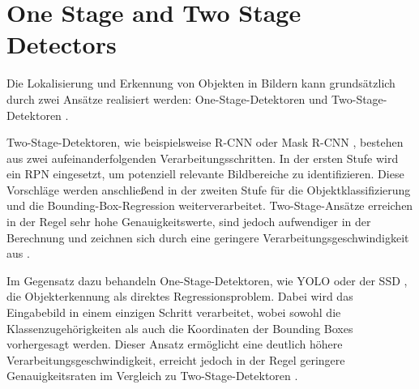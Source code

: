 \section{One Stage and Two Stage Detectors}

Die Lokalisierung und Erkennung von Objekten in Bildern kann grundsätzlich durch zwei Ansätze realisiert werden: One-Stage-Detektoren und Two-Stage-Detektoren \cite{Soviany2018}.

Two-Stage-Detektoren, wie beispielsweise \Acrfull{R-CNN} \cite{ren2016} oder Mask \acrshort{R-CNN} \cite{he2018}, bestehen aus zwei aufeinanderfolgenden Verarbeitungsschritten. In der ersten Stufe wird ein \Acrfull{RPN} eingesetzt, um potenziell relevante Bildbereiche zu identifizieren. Diese Vorschläge werden anschließend in der zweiten Stufe für die Objektklassifizierung und die Bounding-Box-Regression weiterverarbeitet. Two-Stage-Ansätze erreichen in der Regel sehr hohe Genauigkeitswerte, sind jedoch aufwendiger in der Berechnung und zeichnen sich durch eine geringere Verarbeitungsgeschwindigkeit aus \cite{Soviany2018}.

Im Gegensatz dazu behandeln One-Stage-Detektoren, wie \Acrfull{YOLO} \cite{redmon2016} oder der \Acrfull{SSD} \cite{Liu_2016}, die Objekterkennung als direktes Regressionsproblem. Dabei wird das Eingabebild in einem einzigen Schritt verarbeitet, wobei sowohl die Klassenzugehörigkeiten als auch die Koordinaten der Bounding Boxes vorhergesagt werden. Dieser Ansatz ermöglicht eine deutlich höhere Verarbeitungsgeschwindigkeit, erreicht jedoch in der Regel geringere Genauigkeitsraten im Vergleich zu Two-Stage-Detektoren \cite{Soviany2018}.

